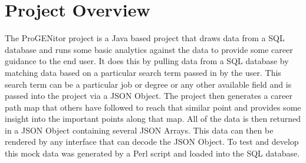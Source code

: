 \section{Project Overview}
\label{sect:project-overview}
The ProGENitor project is a Java based project that draws data from a SQL
database and runs some basic analytics against the data to provide some career
guidance to the end user.  It does this by pulling data from a SQL database by
matching data based on a particular search term passed in by the user.  This
search term can be a particular job or degree or any other available field and
is passed into the project via a JSON Object.  The project then generates a
career path map that others have followed to reach that similar point and
provides some insight into the important points along that map.  All of the
data is then returned in a JSON Object containing several JSON Arrays.  This
data can then be rendered by any interface that can decode the JSON Object.  To
test and develop this mock data was generated by a Perl script and loaded into
the SQL database.
